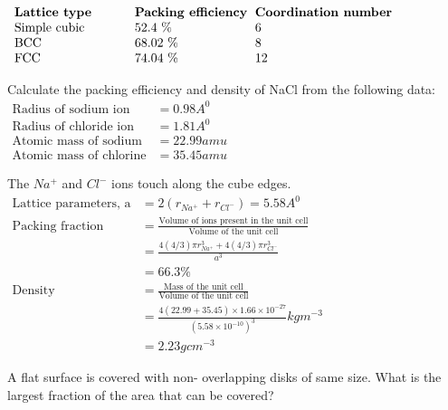 \begin{note}
	$\begin{array}{p{3cm} p{3cm} p{3cm} }
	\text	{\textbf{Lattice type}} & \text{\textbf{Packing efficiency}}& \text{\textbf{Coordination number}}\\
	\text{Simple cubic}& 52.4 \% &6\\
	\text{BCC}& 68.02 \% & 8\\
	\text{FCC}& 74.04 \% & 12
	\end{array}	$\\
\end{note}
\begin{exercise}
	Calculate the packing efficiency and density of NaCl from the following data:\\
	$\begin{aligned}
	\text{Radius of sodium ion} &= 0.98 A^{0}\\
	\text{Radius of chloride ion} &= 1.81 A^{0}\\
	\text{Atomic mass of sodium}&= 22.99 amu\\
	\text{Atomic mass of chlorine} &= 35.45 amu
	\end{aligned}$
\end{exercise}
\begin{answer}
	The $Na^{+}$ and $Cl^{-}$ ions touch along the cube edges.\\
	$\begin{aligned}
	\text{Lattice parameters, a} &= 2\left( r_{Na^{+}}+ r_{Cl^{-}} \right) = 5.58 A^{0}\\
	\text{Packing fraction}&= \frac{\text{Volume of ions present in the unit cell}}{\text{Volume of the unit cell}}\\
	&= \frac{4(4/3)\pi r_{Na^{+}}^{3}+ 4(4/3)\pi r_{Cl^{-}}^{3}}{a^{3}}\\
	&=66.3 \%\\
	\text{Density}&= \frac{\text{Mass of the unit cell}}{\text{Volume of the unit cell}}\\
	&= \frac{4(22.99+ 35.45) \times 1.66 \times 10^{-27}}{(5.58 \times 10^{-10})^{3}} kgm^{-3}\\
	&=2.23 gcm^{-3}
	\end{aligned}$
\end{answer}
\begin{exercise}
	A flat surface is covered with non- overlapping disks of same size. What is the largest fraction of the area that can be covered?
\end{exercise}
